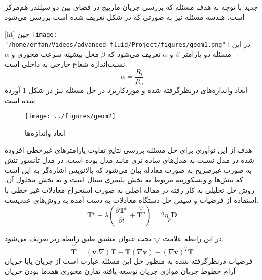 
‌جدید
با توجه به هدف مسئله که بررسی جریان مارپیچ در فضای بین دو سیلندر هم‌مرکز است، هندسه مسئله نیز به صورتی که در شکل
تعریف شده است بررسی می‌شود

[ht]
‌چین
\texttt{[image: "/home/erfan/Videos/advanced\_fluid/Project/figures/geom1.png"]}
در این مسئله دو پارامتر $\beta$  و $\alpha$ تعریف می‌شود که $\beta$ محل بیشینه سرعت محوری و $\alpha$ نسبت‌اندازه شعاع خارجی به داخلی است.
\begin{equation*}
	\alpha = \frac{R_i}{R_o}
\end{equation*}
ابعاد و‌اندازه‌های درنظرگرفته شده و موردکاربرد در حل مسئله نیز در شکل
\ref{fig:geom2}
آورده شده است.
\begin{figure}[ht]
	\centering
	\texttt{[image: ../figures/geom2]}
	\caption{ابعاد و‌اندازه‌ها}
	\label{fig:geom2}
\end{figure}
هدف از این نوآوری برای حل مسئله بررسی نتایج تفاوت پارامتر‌های غیرخطی افزوده شده در مدل
نسبت به مدل‌های ساده تری مانند مدل
بوده است.
در مدل
تانسور تنش به صورت غیرصریح به صورت معادله  بیان می‌شود که بالانویس 
 اشاره‌گر به این است که تنش‌ها و ویسکوزیته مربوط به بخش پلیمری سیال است و نه بخش محلول آن.
روش  حل تحلیلی به کار رفته در مقاله اصلی به صورت استخراج معادلات غیر خطی با استفاده از فرضیات و سپس حل دستگاه معادلات به‌ دست آمده به روش‌های عددیست.
\cite{old}
\begin{equation}
	\label{ucm}
	\mathbf{T}^{p}+\lambda\left(\frac{\partial \mathbf{T}^{p}}{\partial t}+\overset{\bigtriangledown}{\mathbf{T}^{p}}\right)=2 \eta_{p} \mathbf{D}	
\end{equation}

در این رابطه علامت 
$
\bigtriangledown
$
تحت عنوان مشتق
طبق رابطه زیر تعریف می‌شود.
\begin{equation}
		\overset{\bigtriangledown}{\mathbf{T}} = (\mathbf{v}.\nabla)\mathbf{T}-\mathbf{T}(\nabla \mathbf{v}) - (\nabla \mathbf{v})^T\mathbf{T}
\end{equation}
فرضیات درنظرگرفته شده به منظور حل این مسئله عبارت است از
 جریان پایا
 جریان آرام
 خطوط جریان موازی
 جریان توسعه یافته
 تقارن محوری
 همدما بودن جریان

